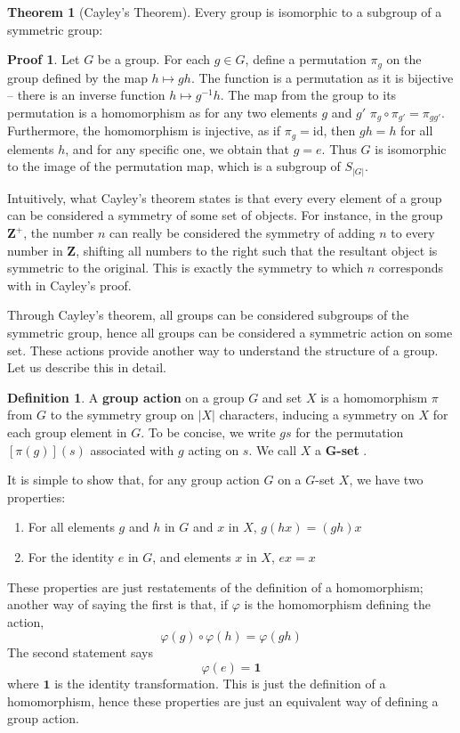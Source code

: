 \documentclass[12pt]{amsbook}
\theoremstyle{definition}
\newtheorem{theorem}{Theorem}[chapter]
\newtheorem{definition}{Definition}
\newtheorem*{prf}{Proof}
\newcommand{\bint}{\mathbf{Z}} %
\begin{document}
\begin{theorem}[Cayley's Theorem] 
    Every group is isomorphic to a subgroup of a symmetric group:
\end{theorem}
\begin{prf}
    Let $G$ be a group. For each $g \in G$, define a permutation $\pi_g$ on the group defined by the map $h \mapsto gh$. The function is a permutation as it is bijective -- there is an inverse function $h \mapsto g^{-1}h$. The map from the group to its permutation is a homomorphism as for any two elements $g$ and $g'$ $\pi_g \circ \pi_{g'} = \pi_{gg'}$. Furthermore, the homomorphism is injective, as if $\pi_g = \text{id}$, then $gh = h$ for all elements $h$, and for any specific one, we obtain that $g = e$. Thus $G$ is isomorphic to the image of the permutation map, which is a subgroup of $S_{|G|}$.
\end{prf}

Intuitively, what Cayley's theorem states is that every every element of a group can be considered a symmetry of some set of objects. For instance, in the group $\bint^+$, the number $n$ can really be considered the symmetry of adding $n$ to every number in $\bint$, shifting all numbers to the right such that the resultant object is symmetric to the original. This is exactly the symmetry to which $n$ corresponds with in Cayley's proof.

Through Cayley's theorem, all groups can be considered subgroups of the symmetric group, hence all groups can be considered a symmetric action on some set. These actions provide another way to understand the structure of a group. Let us describe this in detail.

\begin{definition}
A {\bf group action}  on a group $G$ and set $X$ is a homomorphism $\pi$ from $G$ to the symmetry group on $|X|$ characters, inducing a symmetry on $X$ for each group element in $G$. To be concise, we write $gs$ for the permutation $[\pi(g)](s)$ associated with $g$ acting on $s$. We call $X$ a {\bf G-set} .
\end{definition}

It is simple to show that, for any group action $G$ on a $G$-set $X$, we have two properties:
%
\begin{enumerate}
    \item For all elements $g$ and $h$ in $G$ and $x$ in $X$, $g(hx) = (gh)x$
    \item For the identity $e$ in $G$, and elements $x$ in $X$, $ex = x$
\end{enumerate}
%
These properties are just restatements of the definition of a homomorphism; another way of saying the first is that, if $\varphi$ is the homomorphism defining the action,%
\[\varphi(g) \circ \varphi(h) = \varphi(gh) \]
%
The second statement says
%
\[ \varphi(e) = \mathbf{1} \]
%
where $\mathbf{1}$ is the identity transformation. This is just the definition of a homomorphism, hence these properties are just an equivalent way of defining a group action.
\end{document}
